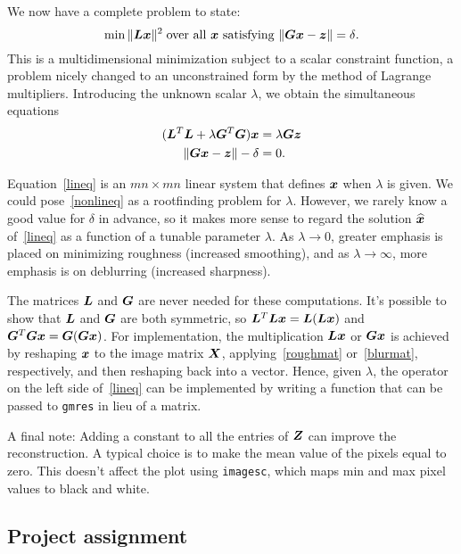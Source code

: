 \documentclass[11pt,letterpaper]{article}
\begin{document}
We now have a complete problem to state:
\begin{equation}
   \label{consopt}
   \min \| \bm{L} \bm{x}\|^2 \; \text{over all $\bm{x}$ satisfying $\|\bm{G}\bm{x}-\bm{z}\| = \delta$.}
\end{equation}
This is a multidimensional minimization subject to a scalar constraint function, a problem nicely changed to an unconstrained form by the method of Lagrange multipliers. Introducing the unknown scalar $\lambda$, we obtain the simultaneous equations
\begin{align}
    (\bm{L}^T\bm{L} + \lambda \bm{G}^T\bm{G})\bm{x} &= \lambda \bm{G}\bm{z} \label{lineq}\\
    \|\bm{G}\bm{x} - \bm{z}\| - \delta & = 0. \label{nonlineq}
\end{align}

Equation~\eqref{lineq} is an $mn\times mn$ linear system that defines $\bm{x}$ when $\lambda$ is given. We could pose~\eqref{nonlineq} as a rootfinding problem for $\lambda$. However, we rarely know a good value for $\delta$ in advance, so it makes more sense to regard the solution $\widehat{\bm{x}}$ of~\eqref{lineq} as a function of a tunable parameter $\lambda$. As $\lambda\to0$, greater emphasis is placed on minimizing roughness (increased smoothing), and as $\lambda\to\infty$, more emphasis is on deblurring (increased sharpness).

The matrices $\bm{L}$ and $\bm{G}$ are never needed for these computations. It's possible to show that $\bm{L}$ and $\bm{G}$ are both symmetric, so $\bm{L}^T\bm{L}\bm{x}=\bm{L}(\bm{L}\bm{x})$ and $\bm{G}^T\bm{G}\bm{x}=\bm{G}(\bm{G}\bm{x})$. For implementation, the multiplication $\bm{L}\bm{x}$ or $\bm{G}\bm{x}$ is achieved by reshaping $\bm{x}$ to the image matrix $\bm{X}$,  applying~\eqref{roughmat} or~\eqref{blurmat}, respectively, and then reshaping back into a vector. Hence, given $\lambda$, the operator on the left side of~\eqref{lineq} can be implemented by writing a function that can be passed to \texttt{gmres} in lieu of a matrix.

A final note: Adding a constant to all the entries of $\bm{Z}$ can improve the reconstruction. A typical choice is to make the mean value of the pixels equal to zero. This doesn't affect the plot using \texttt{imagesc}, which maps min and max pixel values to black and white. 

\subsection*{Project assignment}
\label{sec:project-assignment}
\end{document}
